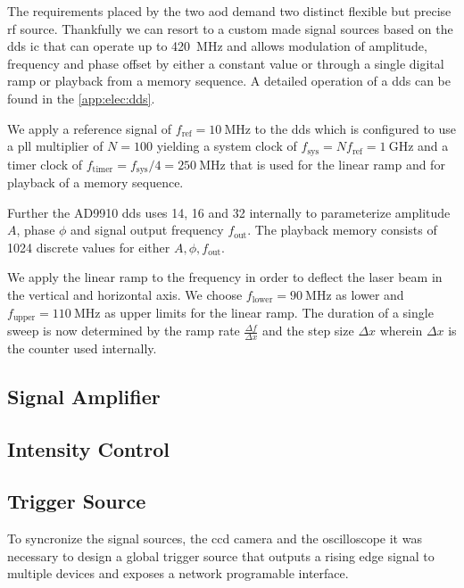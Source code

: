 The requirements placed by the two \gls{aod} demand two distinct flexible but
precise \gls{rf} source. Thankfully we can resort to a custom made signal
sources based on the \gls{dds} \cite{AD9910} \gls{ic} that can operate up to
\SI{420}{\mega\hertz} and allows modulation of amplitude, frequency and
phase offset by either a constant value or through a single digital ramp or
playback from a memory sequence. A detailed operation of a \gls{dds} can be
found in the \cref{app:elec:dds}.

We apply a reference signal of $f_\text{ref}=\SI{10}{\mega\hertz}$ to the
\gls{dds} which is configured to use a \gls{pll} multiplier of $N=100$
yielding a system clock of $f_\text{sys}=Nf_\text{ref}=\SI{1}{\giga\hertz}$
and a timer clock of $f_\text{timer}=f_\text{sys}/4=\SI{250}{\mega\hertz}$
that is used for the linear ramp and for playback of a memory sequence.

Further the AD9910 \gls{dds} uses \SI{14}{\bit}, \SI{16}{\bit} and
\SI{32}{\bit} internally to parameterize amplitude $A$, phase $\phi$ and
signal output frequency $f_\text{out}$. The playback memory consists of
1024 discrete values for either $A,\phi,f_\text{out}$.

We apply the linear ramp to the frequency in order to deflect the laser beam
in the vertical and horizontal axis. We choose
$f_\text{lower}=\SI{90}{\mega\hertz}$ as lower and
$f_\text{upper}=\SI{110}{\mega\hertz}$ as upper limits for the linear ramp.
The duration of a single sweep is now determined by the ramp rate
$\frac{\Delta f}{\Delta x}$ and the step size $\Delta x$ wherein $\Delta x$
is the counter used internally.


\subsection{Signal Amplifier}


\subsection{Intensity Control}


\subsection{Trigger Source}

To syncronize the signal sources, the \gls{ccd} camera and the oscilloscope
it was necessary to design a global trigger source that outputs a rising edge
signal to multiple devices and exposes a network programable interface.

